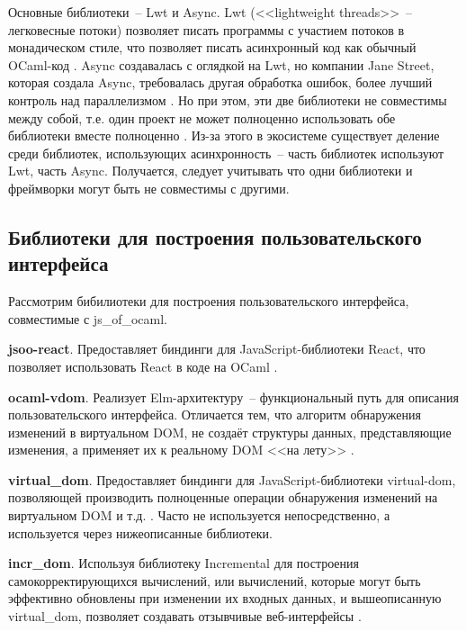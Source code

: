 Основные библиотеки~-- Lwt и Async. Lwt (<<lightweight threads>>~-- легковесные потоки)
позволяет писать программы с участием потоков в монадическом стиле, что позволяет писать
асинхронный код как обычный OCaml-код \cite[с.~1]{vouillon-lwt}. Async создавалась с оглядкой на Lwt,
но компании Jane Street, которая создала Async, требовалась другая обработка ошибок,
более лучший контроль над параллелизмом \cite{announcing-async}. Но при этом, эти две библиотеки
не совместимы между собой, т.е. один проект не может полноценно использовать обе библиотеки
вместе полноценно \cite{rgrinberg-async}. Из-за этого в экосистеме существует деление среди библиотек,
использующих асинхронность~-- часть библиотек используют Lwt, часть Async. Получается, следует
учитывать что одни библиотеки и фреймворки могут быть не совместимы с другими.


\subsection{Библиотеки для построения пользовательского интерфейса}\label{bonsai}

Рассмотрим бибилиотеки для построения пользовательского интерфейса, совместимые с js\_of\_ocaml.

\textbf{jsoo-react}. Предоставляет биндинги для JavaScript-библиотеки React,
что позволяет использовать React в коде на OCaml \cite{jsoo-react}.

\textbf{ocaml-vdom}. Реализует Elm-архитектуру~-- функциональный путь для описания пользовательского интерфейса.
Отличается тем, что алгоритм обнаружения изменений в виртуальном DOM, не создаёт структуры данных,
представляющие изменения, а применяет их к реальному DOM <<на лету>> \cite{lexifi-vdom}.

\textbf{virtual\_dom}. Предоставляет биндинги для JavaScript-библиотеки virtual-dom, позволяющей
производить полноценные операции обнаружения изменений на виртуальном DOM и т.д. \cite{janestreet-virtualdom}.
Часто не используется непосредственно, а используется через нижеописанные библиотеки.

\textbf{incr\_dom}. Используя библиотеку Incremental для построения самокорректирующихся вычислений,
или вычислений, которые могут быть эффективно обновлены при изменении их входных данных,
и вышеописанную virtual\_dom,
позволяет создавать отзывчивые веб-интерфейсы \cite{janestreet-opensource}.


